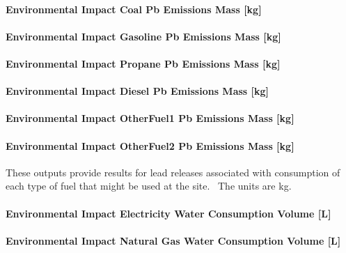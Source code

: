 \paragraph{Environmental Impact Coal Pb Emissions Mass {[}kg{]}}\label{environmental-impact-coal-pb-emissions-mass-kg}

\paragraph{Environmental Impact Gasoline Pb Emissions Mass {[}kg{]}}\label{environmental-impact-gasoline-pb-emissions-mass-kg}

\paragraph{Environmental Impact Propane Pb Emissions Mass {[}kg{]}}\label{environmental-impact-propane-pb-emissions-mass-kg}

\paragraph{Environmental Impact Diesel Pb Emissions Mass {[}kg{]}}\label{environmental-impact-diesel-pb-emissions-mass-kg}

\paragraph{Environmental Impact OtherFuel1 Pb Emissions Mass {[}kg{]}}\label{environmental-impact-otherfuel1-pb-emissions-mass-kg}

\paragraph{Environmental Impact OtherFuel2 Pb Emissions Mass {[}kg{]}}\label{environmental-impact-otherfuel2-pb-emissions-mass-kg}

These outputs provide results for lead releases associated with consumption of each type of fuel that might be used at the site.~ The units are kg.

\paragraph{Environmental Impact Electricity Water Consumption Volume {[}L{]}}\label{environmental-impact-electricity-water-consumption-volume-l}

\paragraph{Environmental Impact Natural Gas Water Consumption Volume {[}L{]}}\label{environmental-impact-natural-gas-water-consumption-volume-l}

